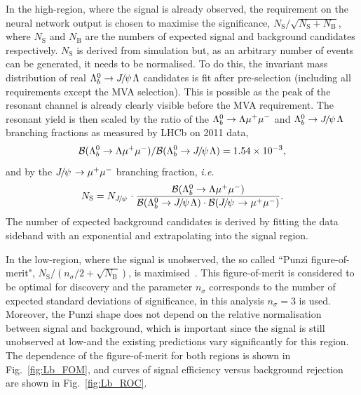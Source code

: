 In the high-\qsq region, where the signal is already observed, the requirement on the neural network output
is chosen to maximise the significance, $N_{\mathrm{S}}/\sqrt{N_{\mathrm{S}}+N_{\mathrm{B}}}$, where
$N_\mathrm{S}$ and $N_\mathrm{B}$ are the numbers of expected signal and background candidates respectively.
$N_\mathrm{S}$ is derived from simulation but, as an arbitrary number of events can be generated, it
needs to be normalised. To do this, the invariant mass distribution of real $\Lb\to\jpsi\Lz$ candidates
is fit after pre-selection (including all requirements except the MVA selection). This is possible as the peak of the resonant
channel is already clearly visible before the MVA requirement. The resonant yield is then scaled by the ratio
of the ${{\Lambda}^0_{b}}\rightarrow{\ensuremath{\Lambda}}{\ensuremath{\mu^+\mu^-}}$ and $\Lb\to\jpsi\Lz$ branching fractions as measured 
by LHCb on 2011 data, 
\begin{equation}
\BR(\Lb\to\Lz\mumu) / \BR(\Lb\to\jpsi\Lz) =  1.54 \times 10^{-3},
\end{equation}
\noindent
and by the $\jpsi\to\mumu$ branching fraction, \emph{i.e.}
\begin{equation}
N_\mathrm{S} = N_\jpsi \cdot \frac{\BR(\Lb\to\Lz\mumu)}{\BR(\Lb\to\jpsi\Lz) \cdot \BR(\jpsi\to\mumu) }.
\end{equation}
%
The number of expected background candidates is derived by fitting the data
sideband with an exponential and extrapolating into the signal region.

In the low-\qsq region, where the signal is unobserved, the so called ``Punzi figure-of-merit",
$N_{\mathrm{S}}/(n_\sigma/2+\sqrt{N_{\mathrm{B}}})$, is maximised~\cite{Punzi:2003bu}.
This figure-of-merit is considered to be optimal for discovery and the parameter $n_\sigma$ corresponds to
the number of expected standard deviations of significance, in this analysis $n_\sigma = 3$ is used.
Moreover, the Punzi shape does not depend on the relative normalisation between signal and background, which
is important since the signal is still unobserved at low-\qsq and the existing predictions vary significantly
for this region. The dependence of the figure-of-merit for both \qsq regions is shown in Fig.~\ref{fig:Lb_FOM}, and curves
of signal efficiency versus background rejection are shown in Fig.~\ref{fig:Lb_ROC}.

